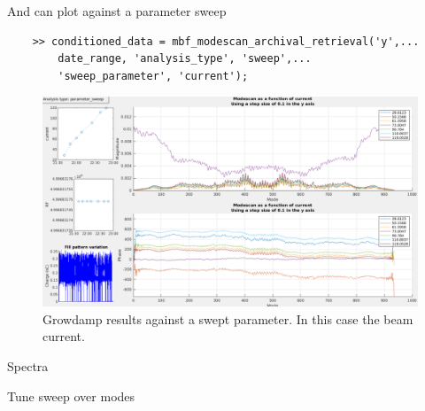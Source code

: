 \documentclass{report}
\begin{document}
And can plot against a parameter sweep 
\begin{verbatim}
    >> conditioned_data = mbf_modescan_archival_retrieval('y',...
        date_range, 'analysis_type', 'sweep',...
        'sweep_parameter', 'current'); 
\end{verbatim}
 \begin{figure}[h]
     \centering
     \includegraphics[width=1\linewidth]{modescan_parameter_sweep.png}
     \caption{Growdamp results against a swept parameter. In this case the beam current.}
     \label{fig:modescan_parameter_sweep}
 \end{figure}
\clearpage
Spectra 

Tune sweep over modes 
\clearpage
\end{document}
